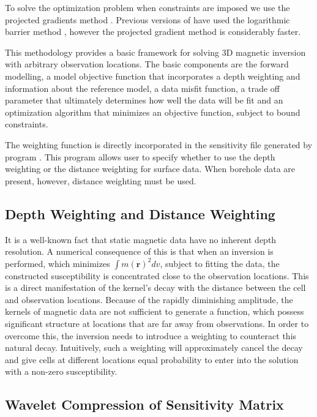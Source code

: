 To solve the optimization problem when constraints are imposed we use the projected gradients method \cite[]{CalamaiMore87,Vogel02}. Previous versions of \programName have used the logarithmic barrier method \cite[]{Wright97,NocedalWright99}, however the projected gradient method is considerably faster.

This methodology provides a basic framework for solving 3D magnetic inversion with arbitrary observation locations. The basic components are the forward modelling, a model objective function that incorporates a depth weighting and information about the reference model, a data misfit function, a trade off parameter that ultimately determines how well the data will be fit and an optimization algorithm that minimizes an objective function, subject to bound constraints.

The weighting function is directly incorporated in the sensitivity file generated by program . This program allows user to specify whether to use the depth weighting or the distance weighting for surface data. When borehole data are present, however, distance weighting must be used.

\subsection{Depth Weighting and Distance Weighting}

It is a well-known fact that static magnetic data have no inherent depth resolution. A numerical consequence of this is that when an inversion is performed, which minimizes $\int m(\mathbf{r})^2 dv$, subject to fitting the data, the constructed susceptibility is concentrated close to the observation locations. This is a direct manifestation of the kernel's decay with the distance between the cell and observation locations. Because of the rapidly diminishing amplitude, the kernels of magnetic data are not sufficient to generate a function, which possess significant structure at locations that are far away from observations. In order to overcome this, the inversion needs to introduce a weighting to counteract this natural decay. Intuitively, such a weighting will approximately cancel the decay and give cells at different locations equal probability to enter into the solution with a non-zero susceptibility.



\subsection{Wavelet Compression of Sensitivity Matrix}
\label{wavelet}

